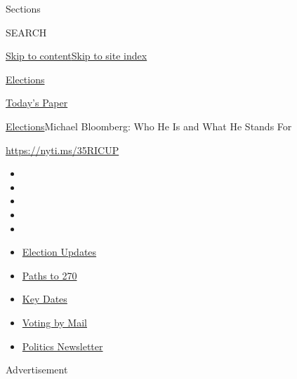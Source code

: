 Sections

SEARCH

\protect\hyperlink{site-content}{Skip to
content}\protect\hyperlink{site-index}{Skip to site index}

\href{https://www.nytimes3xbfgragh.onion/news-event/2020-election}{Elections}

\href{https://myaccount.nytimes3xbfgragh.onion/auth/login?response_type=cookie\&client_id=vi}{}

\href{https://www.nytimes3xbfgragh.onion/section/todayspaper}{Today's
Paper}

\href{/news-event/2020-election}{Elections}\textbar{}Michael Bloomberg:
Who He Is and What He Stands For

\url{https://nyti.ms/35RICUP}

\begin{itemize}
\item
\item
\item
\item
\item
\end{itemize}

\begin{itemize}
\item
  \href{https://www.nytimes3xbfgragh.onion/live/2020/09/11/us/trump-vs-biden?action=click\&pgtype=Article\&state=default\&region=TOP_BANNER\&context=storylines_menu}{Election
  Updates}
\item
  \href{https://www.nytimes3xbfgragh.onion/interactive/2020/us/elections/election-states-biden-trump.html?action=click\&pgtype=Article\&state=default\&region=TOP_BANNER\&context=storylines_menu}{Paths
  to 270}
\item
  \href{https://www.nytimes3xbfgragh.onion/interactive/2019/us/elections/2020-presidential-election-calendar.html?action=click\&pgtype=Article\&state=default\&region=TOP_BANNER\&context=storylines_menu}{Key
  Dates}
\item
  \href{https://www.nytimes3xbfgragh.onion/interactive/2020/08/31/us/politics/vote-by-mail-deadlines.html?action=click\&pgtype=Article\&state=default\&region=TOP_BANNER\&context=storylines_menu}{Voting
  by Mail}
\item
  \href{https://www.nytimes3xbfgragh.onion/newsletters/politics?action=click\&pgtype=Article\&state=default\&region=TOP_BANNER\&context=storylines_menu}{Politics
  Newsletter}
\end{itemize}

Advertisement

